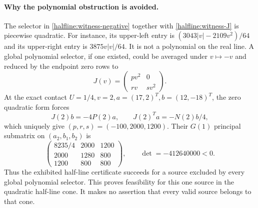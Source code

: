 \paragraph{Why the polynomial obstruction is avoided.}
The selector in \eqref{halfline:witness-negative} together with
\eqref{halfline:witness-J} is piecewise quadratic. For instance,
its upper-left entry is $(3043|v|-2109v^2)/64$ and its upper-right
entry is $3875v|v|/64$. It is not a polynomial on the real line.
A global polynomial selector, if one existed, could be averaged under
$v\mapsto-v$ and reduced by the endpoint zero rows to
\[
 J(v)=\begin{pmatrix}pv^2&0\\rv&sv^2\end{pmatrix}.
\]
At the exact contact $U=1/4,v=2,a=(17,2)^T,b=(12,-18)^T$, the zero
quadratic form forces
\[
 J(2)b=-4P(2)a,\qquad J(2)^Ta=-N(2)b/4,
\]
which uniquely give $(p,r,s)=(-100,2000,1200)$.
Their $G(1)$ principal submatrix on $(a_2,b_1,b_2)$ is
\[
 \begin{pmatrix}8235/4&2000&1200\\2000&1280&800\\1200&800&800\end{pmatrix},
 \qquad \det=-412640000<0.
\]
Thus the exhibited half-line certificate succeeds for a source excluded
by every global polynomial selector. This proves feasibility for this
one source in the quadratic half-line cone. It makes no assertion that
every valid source belongs to that cone.

